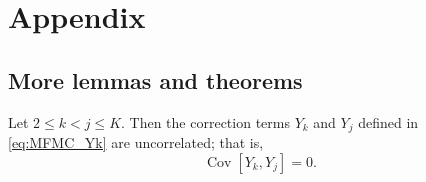 
\section{Appendix}\label{sec:Appendix}
\subsection{More lemmas and theorems}
\begin{lemma}\label{lemma:Y_k_Y_j}
Let $2\le k<j\le K$. Then the correction terms $Y_k$ and $Y_j$ defined in \eqref{eq:MFMC_Yk} are uncorrelated; that is,
\begin{equation*}
    \operatorname{Cov} \left[Y_k,Y_j\right]=0.
\end{equation*}
\end{lemma}

